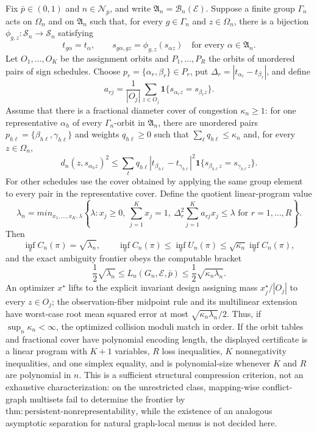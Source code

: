 Fix \(\bar p\in(0,1)\) and \(n\in\mathcal N_{\bar p}\), and write \(\mathfrak A_n=\mathcal B_n(\mathcal E)\). Suppose a finite group \(\Gamma_n\) acts on \(\Omega_n\) and on \(\mathfrak A_n\) such that, for every \(g\in\Gamma_n\) and \(z\in\Omega_n\), there is a bijection \(\phi_{g,z}:\mathcal S_n\to\mathcal S_n\) satisfying
\[
 t_{g\alpha}=t_\alpha,
 \qquad
 s_{g\alpha,gz}=\phi_{g,z}(s_{\alpha z})
 \quad\text{for every }\alpha\in\mathfrak A_n.
\]
Let \(O_1,\ldots,O_K\) be the assignment orbits and \(P_1,\ldots,P_R\) the orbits of unordered pairs of sign schedules. Choose \(p_r=\{\alpha_r,\beta_r\}\in P_r\), put \(\Delta_r=|t_{\alpha_r}-t_{\beta_r}|\), and define
\[
 a_{rj}=\frac{1}{|O_j|}\sum_{z\in O_j}
 \mathbf 1\{s_{\alpha_r z}=s_{\beta_r z}\}.
\]
Assume that there is a fractional diameter cover of congestion \(\kappa_n\ge1\): for one representative \(\alpha_h\) of every \(\Gamma_n\)-orbit in \(\mathfrak A_n\), there are unordered pairs \(p_{h\ell}=\{\beta_{h\ell},\gamma_{h\ell}\}\) and weights \(q_{h\ell}\ge0\) such that \(\sum_\ell q_{h\ell}\le\kappa_n\) and, for every \(z\in\Omega_n\),
\[
 d_n(z,s_{\alpha_h z})^2
 \le
 \sum_\ell q_{h\ell}
 |t_{\beta_{h\ell}}-t_{\gamma_{h\ell}}|^2
 \mathbf 1\{s_{\beta_{h\ell}z}=s_{\gamma_{h\ell}z}\}.
\]
For other schedules use the cover obtained by applying the same group element to every pair in the representative cover. Define the quotient linear-program value
\[
 \lambda_n=min_{x_1,\ldots,x_K,\lambda}
 \left\{\lambda:
 x_j\ge0,\ \sum_{j=1}^Kx_j=1,\
 \Delta_r^2\sum_{j=1}^K a_{rj}x_j\le\lambda
 \text{ for }r=1,\ldots,R\right\}.
\]
Then
\[
 \inf_\pi C_n(\pi)=\sqrt{\lambda_n},
 \qquad
 \inf_\pi C_n(\pi)
 \le \inf_\pi U_n(\pi)
 \le \sqrt{\kappa_n}\inf_\pi C_n(\pi),
\]
and the exact ambiguity frontier obeys the computable bracket
\[
 \frac12\sqrt{\lambda_n}
 \le L_n(G_n,\mathcal E,\bar p)
 \le \frac12\sqrt{\kappa_n\lambda_n}.
\]
An optimizer \(x^\star\) lifts to the explicit invariant design assigning mass \(x_j^\star/|O_j|\) to every \(z\in O_j\); the observation-fiber midpoint rule and its multilinear extension have worst-case root mean squared error at most \(\sqrt{\kappa_n\lambda_n}/2\). Thus, if \(\sup_n\kappa_n<\infty\), the optimized collision moduli match in order. If the orbit tables and fractional cover have polynomial encoding length, the displayed certificate is a linear program with \(K+1\) variables, \(R\) loss inequalities, \(K\) nonnegativity inequalities, and one simplex equality, and is polynomial-size whenever \(K\) and \(R\) are polynomial in \(n\). This is a sufficient structural compression criterion, not an exhaustive characterization: on the unrestricted class, mapping-wise conflict-graph multisets fail to determine the frontier by \(\mathrm{thm{:}persistent\text{-}nonrepresentability}\), while the existence of an analogous asymptotic separation for natural graph-local menus is not decided here.